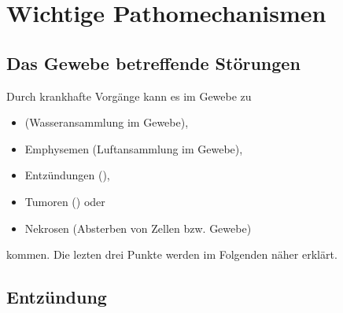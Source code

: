 \bigskip

\section{Wichtige Pathomechanismen}


\subsection{Das Gewebe betreffende Störungen}

Durch krankhafte Vorgänge kann es im Gewebe zu
\begin{itemize}
    \item {} (Wasseransammlung im
    Gewebe),
    \item Emphysemen (Luftansammlung im Gewebe),
    \item Entzündungen (),
    \item Tumoren () oder
    \item Nekrosen (Absterben von Zellen bzw. Gewebe)
\end{itemize}
kommen. Die lezten drei Punkte werden im Folgenden näher
erklärt.

\subsection{Entzündung}

